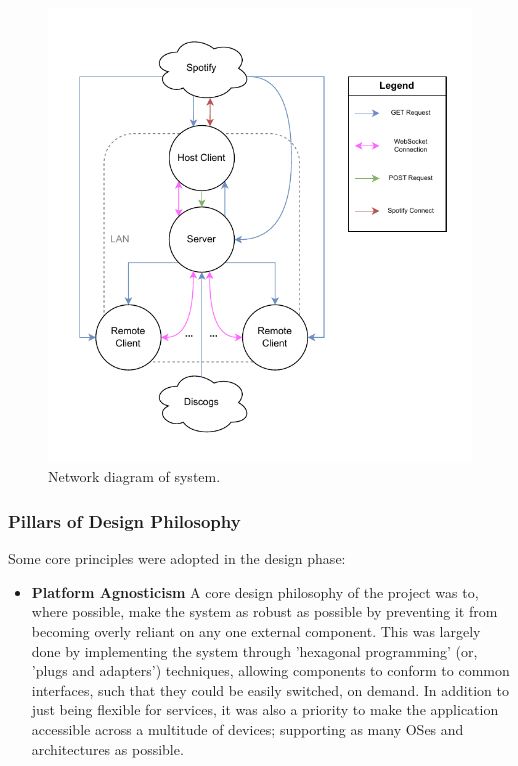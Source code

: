                 \begin{figure}[h]
                    \centering
                    \includegraphics[width=\textwidth]{images/VTT_network.NetworkDiagram.pdf}
                    \caption{Network diagram of system. }
                    \label{fig:networkDiagram}
                \end{figure}
    
            \subsubsection{Pillars of Design Philosophy}
    
                Some core principles were adopted in the design phase:
    
                \begin{itemize}
                    \item \textbf{Platform Agnosticism} A core design philosophy of the project was to, where possible, make the system as robust as possible by preventing it from becoming overly reliant on any one external component. This was largely done by implementing the system through 'hexagonal programming' (or, 'plugs and adapters') techniques, allowing components to conform to common interfaces, such that they could be easily switched, on demand. In addition to just being flexible for services, it was also a priority to make the application accessible across a multitude of devices; supporting as many OSes and architectures as possible.
                \end{itemize}
    
